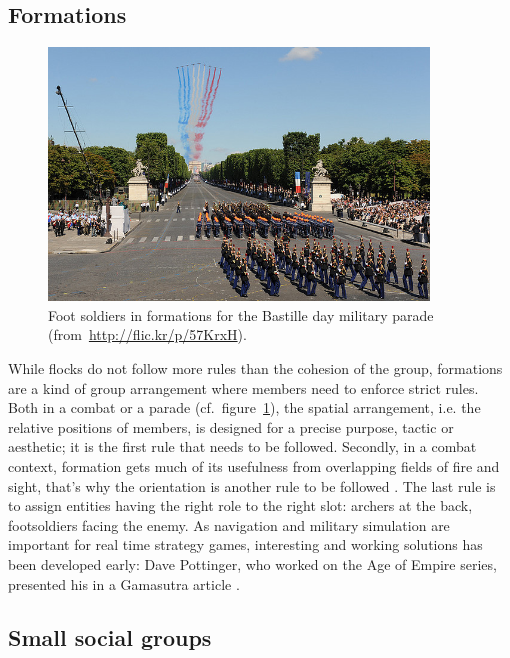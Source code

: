 \documentclass[a4paper,titlepage]{article}
\begin{document}
\subsection{Formations}
\label{sec:taxonomy:formations}

\begin{figure}[h]
\centering
\includegraphics[width=0.9\textwidth]{BastilleDay.jpg}
\caption{Foot soldiers in formations for the Bastille day military parade (from~\url{http://flic.kr/p/57KrxH}).}
\label{fig:bastille_day}
\end{figure}

While flocks do not follow more rules than the cohesion of the group, formations are a kind of group arrangement where members need to enforce strict rules. Both in a combat or a parade (cf.\ figure~\ref{fig:bastille_day}), the spatial arrangement, i.e. the relative positions of members, is designed for a precise purpose, tactic or aesthetic; it is the first rule that needs to be followed. Secondly, in a combat context, formation gets much of its usefulness from overlapping fields of fire and sight, that’s why the orientation is another rule to be followed \cite{Dawson:2002vd}. The last rule is to assign entities having the right role to the right slot: archers at the back, footsoldiers facing the enemy. As navigation and military simulation are important for real time strategy games, interesting and working solutions has been developed early: Dave Pottinger, who worked on the Age of Empire series, presented his in a Gamasutra article \cite{Pottinger:1999vk}.

\subsection{Small social groups}
\label{sec:taxonomy:small_social_groups}
\end{document}

